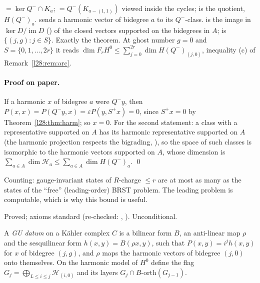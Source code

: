 \begin{dictionary}
 $=\ker Q^-\cap K_a$;  $=Q^-(K_{a-(1,1)})$ viewed inside the cycles;  is the
quotient, $H(Q^-)_a$.  sends a harmonic vector of bidegree $a$ to its $Q^-$-class.  is the image in
$\ker D/\operatorname{im}D$ () of the closed vectors supported on the bidegrees in $A$;  is
$\{(j,g):j\in S\}$. Exactly the theorem. At ghost number $g=0$ and $S=\{0,1,\dots,2r\}$ it reads
$\dim F_rH^0\le\sum_{j=0}^{2r}\dim H(Q^-)_{(j,0)}$, inequality (c) of Remark~\ref{l28:rem:arc}.
\end{dictionary}

\paragraph{Proof on paper.} If a harmonic $x$ of bidegree $a$ were $Q^-y$, then
$P(x,x)=P(Q^-y,x)=\varepsilon P(y,S^+x)=0$, since $S^+x=0$ by Theorem~\ref{l28:thm:harm}; so $x=0$. For the second statement: a class with a
representative supported on $A$ has its harmonic representative supported on $A$ (the harmonic projection respects the bigrading,
), so the space of such classes is isomorphic to the harmonic vectors supported on $A$, whose dimension is
$\sum_{a\in A}\dim\mathcal H_a\le\sum_{a\in A}\dim H(Q^-)_a$. \qed

\begin{physics}
Counting: gauge-invariant states of $R$-charge $\le r$ are at most as many as the states of the ``free'' (leading-order) BRST problem. The
leading problem is computable, which is why this bound is useful.
\end{physics}

\begin{status}
Proved; axioms standard (re-checked: , ). Unconditional.
\end{status}

\begin{definition}\label{l28:def:gudata}
A \emph{GU datum} on a Kähler complex $C$ is a bilinear form $B$, an anti-linear map $\rho$ and the sesquilinear form $h(x,y)=B(\rho x,y)$, such
that $P(x,y)=i^{j}h(x,y)$ for $x$ of bidegree $(j,g)$, and $\rho$ maps the harmonic vectors of bidegree $(j,0)$ onto themselves. On the harmonic
model of $H^0$ define the flag $G_j=\bigoplus_{L\le i\le j}\mathcal H_{(i,0)}$ and its layers $G_j\cap B\text{-}\mathrm{orth}(G_{j-1})$.
\end{definition}

